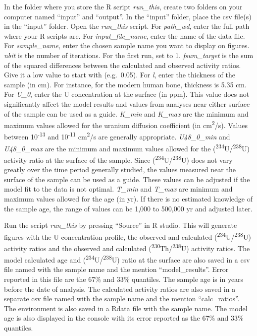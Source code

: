 \documentclass[]{article}
\begin{document}
In the folder where you store the R script \emph{run\_this}, create two
folders on your computer named ``input'' and ``output''. In the
``input'' folder, place the csv file(s) in the ``input'' folder. Open
the \emph{run\_this} script. For \emph{path\_wd}, enter the full path
where your R scripts are. For \emph{input\_file\_name}, enter the name
of the data file. For \emph{sample\_name}, enter the chosen sample name
you want to display on figures. \emph{nbit} is the number of iterations.
For the first run, set to 1. \emph{fsum\_target} is the sum of the
squared differences between the calculated and observed activity ratios.
Give it a low value to start with (e.g.~0.05). For \emph{l}, enter the
thickness of the sample (in cm). For instance, for the modern human
bone, thickness is 5.35 cm. For \emph{U\_0}, enter the U concentration
at the surface (in ppm). This value does not significantly affect the
model results and values from analyses near either surface of the sample
can be used as a guide. \emph{K\_min} and \emph{K\_max} are the minimum
and maximum values allowed for the uranium diffusion coefficient (in
cm\textsuperscript{2}/s). Values between 10\textsuperscript{-13} and
10\textsuperscript{-11} cm\textsuperscript{2}/s are generally
appropriate. \emph{U48\_0\_min} and \emph{U48\_0\_max} are the minimum
and maximum values allowed for the
(\textsuperscript{234}U/\textsuperscript{238}U) activity ratio at the
surface of the sample. Since
(\textsuperscript{234}U/\textsuperscript{238}U) does not vary greatly
over the time period generally studied, the values measured near the
surface of the sample can be used as a guide. These values can be
adjusted if the model fit to the data is not optimal. \emph{T\_min} and
\emph{T\_max} are minimum and maximum values allowed for the age (in
yr). If there is no estimated knowledge of the sample age, the range of
values can be 1,000 to 500,000 yr and adjusted later.

Run the script \emph{run\_this} by pressing ``Source'' in R studio. This
will generate figures with the U concentration profile, the observed and
calculated (\textsuperscript{234}U/\textsuperscript{238}U) activity
ratios and the observed and calculated
(\textsuperscript{230}Th/\textsuperscript{238}U) activity ratios. The
model calculated age and (\textsuperscript{234}U/\textsuperscript{238}U)
ratio at the surface are also saved in a csv file named with the sample
name and the mention ``model\_results''. Error reported in this file are
the 67\% and 33\% quantiles. The sample age is in years before the date
of analysis. The calculated activity ratios are also saved in a separate
csv file named with the sample name and the mention ``calc\_ratios''.
The environment is also saved in a Rdata file with the sample name. The
model age is also displayed in the console with its error reported as
the 67\% and 33\% quantiles.
\end{document}
